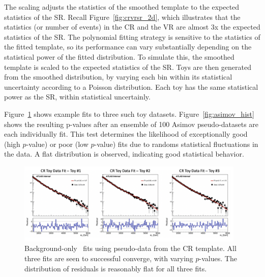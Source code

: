 The scaling adjusts the statistics of the smoothed template to the expected statistics of the SR.
Recall Figure~\ref{fig:crvrsr_2d}, which illustrates that the statistics (or number of events) in the CR and the VR are almost 3x the expected statistics of the SR.
The polynomial fitting strategy is sensitive to the statistics of the fitted template, so its performance can vary substantially depending on the statistical power of the fitted distribution.
To simulate this, the smoothed template is scaled to the expected statistics of the SR.
Toys are then generated from the smoothed distribution, by varying each bin within its statistical uncertainty according to a Poisson distribution. 
Each toy has the same statistical power as the SR, within statistical uncertainly.

Figure~\ref{fig:bkgfit_data} shows example fits to three such toy datasets.
Figure~\ref{fig:asimov_hist} shows the resulting p-values after an ensemble of 100 Asimov pseudo-datasets are each individually fit. 
This test determines the likelihood of exceptionally good (high $p$-value) or poor (low $p$-value) fits due to randoms statistical fluctuations in the data. 
A flat distribution is observed, indicating good statistical behavior. 

\begin{figure}[!htbp]
\centering
   \includegraphics[width=0.97\textwidth]{figures/stats/bkgfit_data_cr}
    \caption{Background-only \mt~fits using pseudo-data from the CR template. All three fits are seen to successful converge, with varying $p$-values. The distribution of residuals is reasonably flat for all three fits.
     \label{fig:bkgfit_data}}
\end{figure}

